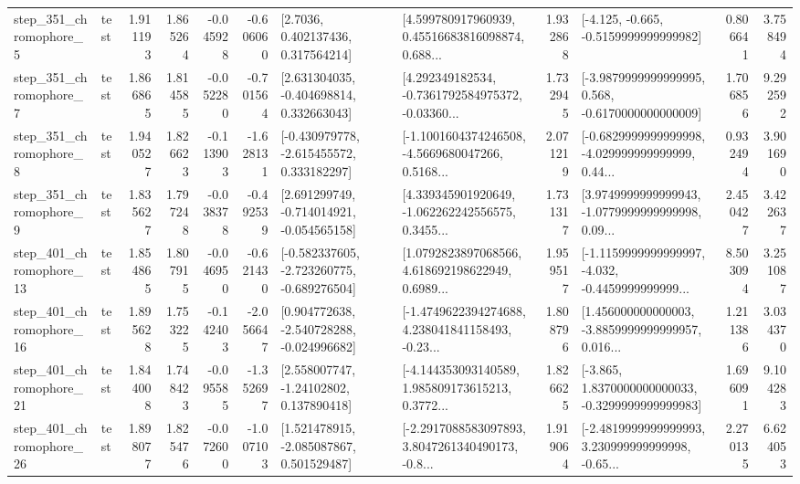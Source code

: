 \begin{tabular}{llrrrrllrlrr}
   step\_351\_chromophore\_5 &      test &      1.911193 &    1.865264 &     -0.045928 & -0.606060 &          [2.7036, 0.402137436, 0.317564214] &  [4.599780917960939, 0.45516683816098874, 0.688... &       1.932868 &              [-4.125, -0.665, -0.5159999999999982] &            0.806641 &          3.758494 \\
   step\_351\_chromophore\_7 &      test &      1.866865 &    1.814585 &     -0.052280 & -0.701564 &    [2.631304035, -0.404698814, 0.332663043] &  [4.292349182534, -0.7361792584975372, -0.03360... &       1.732945 &  [-3.9879999999999995, 0.568, -0.6170000000000009] &            1.706856 &          9.292592 \\
   step\_351\_chromophore\_8 &      test &      1.940527 &    1.826623 &     -0.113903 & -1.628131 &   [-0.430979778, -2.615455572, 0.333182297] &  [-1.1001604374246508, -4.5669680047266, 0.5168... &       2.071219 &  [-0.6829999999999998, -4.029999999999999, 0.44... &            0.932494 &          3.901690 \\
   step\_351\_chromophore\_9 &      test &      1.835627 &    1.797248 &     -0.038378 & -0.492539 &   [2.691299749, -0.714014921, -0.054565158] &  [4.339345901920649, -1.062262242556575, 0.3455... &       1.731317 &  [3.9749999999999943, -1.0779999999999998, 0.09... &            2.450427 &          3.422637 \\
  step\_401\_chromophore\_13 &      test &      1.854865 &    1.807915 &     -0.046950 & -0.621430 &  [-0.582337605, -2.723260775, -0.689276504] &  [1.0792823897068566, 4.618692198622949, 0.6989... &       1.959517 &  [-1.1159999999999997, -4.032, -0.4459999999999... &            8.503094 &          3.251087 \\
  step\_401\_chromophore\_16 &      test &      1.895628 &    1.753225 &     -0.142403 & -2.056647 &   [0.904772638, -2.540728288, -0.024996682] &  [-1.4749622394274688, 4.238041841158493, -0.23... &       1.808796 &  [1.456000000000003, -3.8859999999999957, 0.016... &            1.211386 &          3.034370 \\
  step\_401\_chromophore\_21 &      test &      1.844008 &    1.748423 &     -0.095585 & -1.352697 &     [2.558007747, -1.24102802, 0.137890418] &  [-4.144353093140589, 1.985809173615213, 0.3772... &       1.826625 &  [-3.865, 1.8370000000000033, -0.3299999999999983] &            1.696091 &          9.104283 \\
  step\_401\_chromophore\_26 &      test &      1.898077 &    1.825476 &     -0.072600 & -1.007103 &    [1.521478915, -2.085087867, 0.501529487] &  [-2.2917088583097893, 3.8047261340490173, -0.8... &       1.919064 &  [-2.4819999999999993, 3.230999999999998, -0.65... &            2.270135 &          6.624053 \\

\end{tabular}
